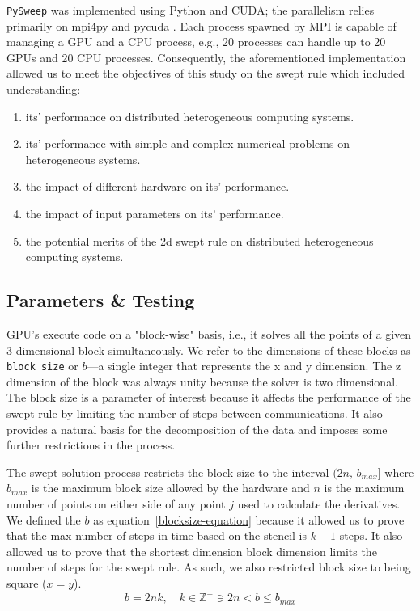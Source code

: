 \documentclass[review]{elsarticle}
\def\pysweep{\texttt{PySweep}}
\begin{document}
\par
\pysweep{} was implemented using Python and CUDA; the parallelism relies primarily on mpi4py and pycuda \cite{DalcinMPIPython, KlocknerPyCUDAGeneration}. Each process spawned by MPI is capable of managing a GPU and a CPU process, e.g., 20 processes can handle up to 20 GPUs and 20 CPU processes. Consequently, the aforementioned implementation allowed us to meet the objectives of this study on the swept rule which included understanding:
\begin{enumerate}
    \item its' performance on distributed heterogeneous computing systems.
    \item its' performance with simple and complex numerical problems on heterogeneous systems.
    \item the impact of different hardware on its' performance.
    \item the impact of input parameters on its' performance.
    \item the potential merits of the 2d swept rule on distributed heterogeneous computing systems.
\end{enumerate}

\subsection{Parameters \& Testing}
\label{parameters-section}

GPU's execute code on a "block-wise" basis, i.e., it solves all the points of a given 3 dimensional block simultaneously. We refer to the dimensions of these blocks as \texttt{block size} or $b$---a single integer that represents the x and y dimension. The z dimension of the block was always unity because the solver is two dimensional. The block size is a parameter of interest because it affects the performance of the swept rule by limiting the number of steps between communications. It also provides a natural basis for the decomposition of the data and imposes some further restrictions in the process.

\par 
The swept solution process restricts the block size to the interval $(2n,\,b_{max}]$ where $b_{max}$ is the maximum block size allowed by the hardware and $n$ is the maximum number of points on either side of any point $j$ used to calculate the derivatives. We defined the $b$ as equation~\ref{blocksize-equation} because it allowed us to prove that the max number of steps in time based on the stencil is $k-1$ steps. It also allowed us to prove that the shortest dimension block dimension limits the number of steps for the swept rule. As such, we also restricted block size to being square ($x=y$).
\begin{equation}
    \label{blocksize-equation}
    b  = 2nk,\quad k\in\mathbb{Z}^{+}\ni 2n < b \leq b_{max}
\end{equation}
\end{document}
